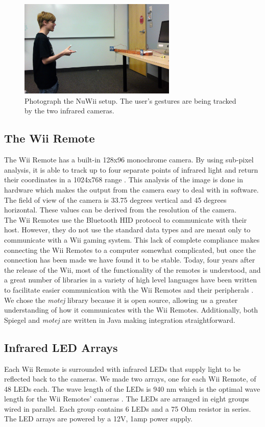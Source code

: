 \documentclass[a4paper,twoside]{article}
\begin{document}
 
\begin{figure}[h] \begin{center} \includegraphics[width = 7.5cm]{setup}
\end{center} \caption{Photograph the NuWii setup. The user's gestures are being
tracked by the two infrared cameras.} \label{setup} \end{figure}
 
\subsection{The Wii Remote} The Wii Remote has a built-in 128x96 monochrome
camera. By using sub-pixel analysis, it is able to track up to four separate
points of infrared light and return their coordinates in a 1024x768 range
\cite{WiiBrew10}. This analysis of the image is done in hardware which makes
the output from the camera easy to deal with in software. The field of view of
the camera is 33.75 degrees vertical and 45 degrees horizontal. These values
can be derived from the resolution of the camera\cite{Lee08}. \\

The Wii Remotes use the Bluetooth HID protocol to communicate with their host.
However, they do not use the standard data types and are meant only to
communicate with a Wii gaming system. This lack of complete compliance makes
connecting the Wii Remotes to a computer somewhat complicated, but once the
connection has been made we have found it to be stable. Today, four years after
the release of the Wii, most of the functionality of the remotes is understood,
and a great number of libraries in a variety of high level languages have been
written to facilitate easier communication with the Wii Remotes and their
peripherals \cite{WiiBrew10}. We chose the \emph{motej} library because it is
open source, allowing us a greater understanding of how it communicates with
the Wii Remotes.  Additionally, both Spiegel and \emph{motej} are written in
Java making integration straightforward.

\subsection{Infrared LED Arrays} Each Wii Remote is surrounded with infrared
LEDs that supply light to be reflected back to the cameras. We made two arrays,
one for each Wii Remote, of 48 LEDs each. The wave length of the LEDs is 940 nm
which is the optimal wave length for the Wii Remotes' cameras \cite{WiiBrew10}.
The LEDs are arranged in eight groups wired in parallel. Each group contains 6
LEDs and a 75 Ohm resistor in series. The LED arrays are powered by a 12V, 1amp
power supply.
 
\end{document}
